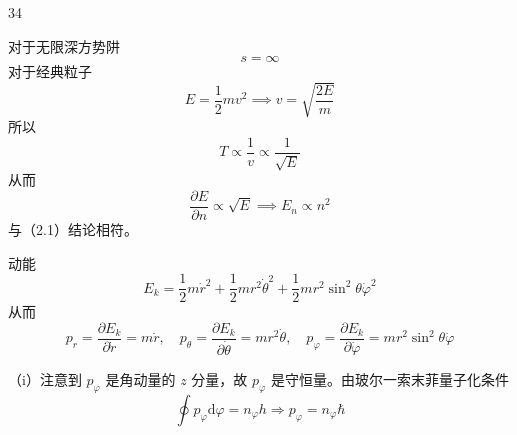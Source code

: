 \begin{solution}{34}
\begin{subsolution}
\begin{subsubsolution}
            对于无限深方势阱
            \begin{equation}
                s = \infty
                \label{eq:8.s34}
            \end{equation}
            对于经典粒子
            \begin{equation}
                E = \frac {1}{2} m v ^ {2} \implies v = \sqrt {\frac {2 E}{m}}
                \label{eq:9.s34}
            \end{equation}
            所以
            \begin{equation}
                T \propto \frac {1}{v} \propto \frac {1}{\sqrt {E}}
                \label{eq:10.s34}
            \end{equation}
            从而
            \begin{equation}
                \frac {\partial E}{\partial n} \propto \sqrt {E} \implies E _ {n} \propto n ^ {2}
                \label{eq:11.s34}
            \end{equation}
            与（2.1）结论相符。
        \end{subsubsolution}
    \end{subsolution}
    \begin{subsolution}
        \begin{subsubsolution}
            动能
            \begin{equation}
                E _ {k} = \frac {1}{2} m \dot {r} ^ {2} + \frac {1}{2} m r ^ {2} \dot {\theta} ^ {2} + \frac {1}{2} m r ^ {2} \sin^ {2} \theta \dot {\varphi} ^ {2}
                \label{eq:12.s34}
            \end{equation}
            从而
            \begin{equation}
                p _ {r} = \frac {\partial E _ {k}}{\partial \dot {r}} = m \dot {r}, \quad p _ {\theta} = \frac {\partial E _ {k}}{\partial \dot {\theta}} = m r ^ {2} \dot {\theta}, \quad p _ {\varphi} = \frac {\partial E _ {k}}{\partial \dot {\varphi}} = m r ^ {2} \sin^ {2} \theta \dot {\varphi}
                \label{eq:13.s34}
            \end{equation}
        \end{subsubsolution}
        \begin{subsubsolution}
            （i）注意到 $p_{\varphi}$ 是角动量的 $z$ 分量，故 $p_{\varphi}$ 是守恒量。由玻尔一索末菲量子化条件
            \begin{equation}
                \oint p _ {\varphi} \mathrm{d} \varphi = n _ {\varphi} h \Rightarrow p _ {\varphi} = n _ {\varphi} \hbar

\end{equation}
\end{subsubsolution}
\end{subsolution}
\end{solution}
